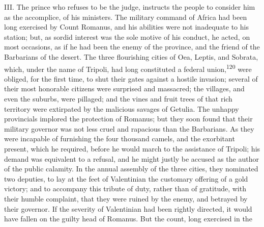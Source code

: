 

III. The prince who refuses to be the judge, instructs the people
to consider him as the accomplice, of his ministers. The military
command of Africa had been long exercised by Count Romanus, and
his abilities were not inadequate to his station; but, as sordid
interest was the sole motive of his conduct, he acted, on most
occasions, as if he had been the enemy of the province, and the
friend of the Barbarians of the desert. The three flourishing
cities of Oea, Leptis, and Sobrata, which, under the name of
Tripoli, had long constituted a federal union,\textsuperscript{120} were obliged,
for the first time, to shut their gates against a hostile
invasion; several of their most honorable citizens were surprised
and massacred; the villages, and even the suburbs, were pillaged;
and the vines and fruit trees of that rich territory were
extirpated by the malicious savages of Getulia. The unhappy
provincials implored the protection of Romanus; but they soon
found that their military governor was not less cruel and
rapacious than the Barbarians. As they were incapable of
furnishing the four thousand camels, and the exorbitant present,
which he required, before he would march to the assistance of
Tripoli; his demand was equivalent to a refusal, and he might
justly be accused as the author of the public calamity. In the
annual assembly of the three cities, they nominated two deputies,
to lay at the feet of Valentinian the customary offering of a
gold victory; and to accompany this tribute of duty, rather than
of gratitude, with their humble complaint, that they were ruined
by the enemy, and betrayed by their governor. If the severity of
Valentinian had been rightly directed, it would have fallen on
the guilty head of Romanus. But the count, long exercised in the

